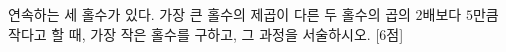연속하는 세 홀수가 있다. 가장 큰 홀수의 제곱이 다른 두 홀수의 곱의 $2$배보다 $5$만큼 작다고 할 때, 가장 작은 홀수를 구하고, 그 과정을 서술하시오. \mbox{[6점]}
